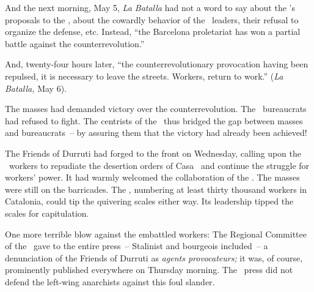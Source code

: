And the next morning, May 5, \emph{La Batalla} had not a word to say about the \POUM’s proposals to the \CNT\kn, about the cowardly behavior of the \CNT\ leaders, their refusal to organize the defense, etc. Instead, ``the Barcelona proletariat has won a partial battle against the counterrevolution.''

And, twenty-four hours later, ``the counterrevolutionary provocation having been repulsed, it is necessary to leave the streets. Workers, return to work.'' (\emph{La Batalla,} May 6).

The masses had demanded victory over the counterrevolution. The \CNT\ bureaucrats had refused to fight. The centrists of the \POUM\ thus bridged the gap between masses and bureaucrats~-- by assuring them that the victory had already been achieved!

The Friends of Durruti had forged to the front on Wednesday, calling upon the \CNT\ workers to repudiate the desertion orders of Casa \CNT\ and continue the struggle for workers’ power. It had warmly welcomed the collaboration of the \POUM\kn. The masses were still on the barricades. The \POUM\kn, numbering at least thirty thousand workers in Catalonia, could tip the quivering scales either way. Its leadership tipped the scales for capitulation.

One more terrible blow against the embattled workers: The Regional Committee of the \CNT\ gave to the entire press~-- Stalinist and bourgeois included~-- a denunciation of the Friends of Durruti as \emph{agents provocateurs;} it was, of course, prominently published everywhere on Thursday morning. The \POUM\ press did not defend the left-wing anarchists against this foul slander.

